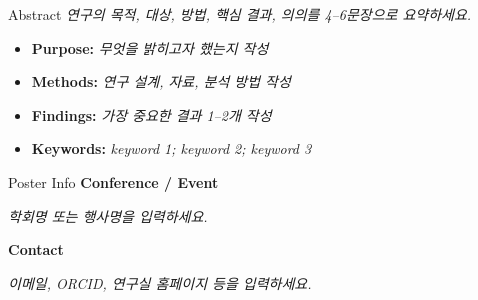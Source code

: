 \documentclass[a0paper,portrait]{KNUE_baposter}
\newcommand{\TemplateText}[1]{{\color{aaublue2}\itshape #1}}
\begin{document}
\begin{poster}
%
\begin{posterbox}[name=abstract,column=0,row=0,span=2]{Abstract}
\footnotesize
\TemplateText{연구의 목적, 대상, 방법, 핵심 결과, 의의를 4--6문장으로 요약하세요.}

\vspace{0.7em}
\scriptsize
\begin{itemize}
\item \textbf{Purpose:} \TemplateText{무엇을 밝히고자 했는지 작성}
\item \textbf{Methods:} \TemplateText{연구 설계, 자료, 분석 방법 작성}
\item \textbf{Findings:} \TemplateText{가장 중요한 결과 1--2개 작성}
\item \textbf{Keywords:} \TemplateText{keyword 1; keyword 2; keyword 3}
\end{itemize}
\end{posterbox}

%
\begin{posterbox}[name=posterinfo,column=2,row=0]{Poster Info}
\footnotesize
\textbf{Conference / Event}

\scriptsize
\TemplateText{학회명 또는 행사명을 입력하세요.}

\vspace{0.6em}
\footnotesize
\textbf{Contact}

\scriptsize
\TemplateText{이메일, ORCID, 연구실 홈페이지 등을 입력하세요.}


\end{posterbox}
\end{poster}
\end{document}
